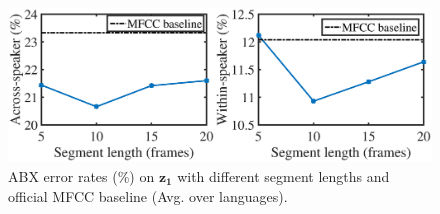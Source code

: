 \documentclass[a4paper]{article}
\begin{document}
\begin{figure}[t]
    \centering
    \includegraphics[width=0.9\linewidth]{tune_seg_len2_export_setup.eps}
    \caption{ABX error rates (\%) on  $\bm{z_1}$ with  different segment lengths and official MFCC baseline \cite{dunbar2017zero} (Avg. over languages).}
    \label{fig:tune_len}
\end{figure}


\end{document}

